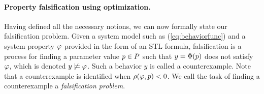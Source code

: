 



\paragraph{Property falsification using optimization.}	

Having defined all the necessary notions, we can now formally state our falsification problem.
Given a system model such as (\ref{eq:behaviorfunc}) and a system property $\varphi$ provided in the form of an STL formula, 
falsification is a process for finding a parameter value $p \in P$
such that $y=\Phi(p)$ does not satisfy $\varphi$, which is denoted $y
\not\models \varphi$. Such a behavior $y$ is called a counterexample. 
Note that a counterexample is identified when 
$\rho(\varphi,p)<0$. We call the task of finding a counterexample 
a {\em falsification problem}. 


